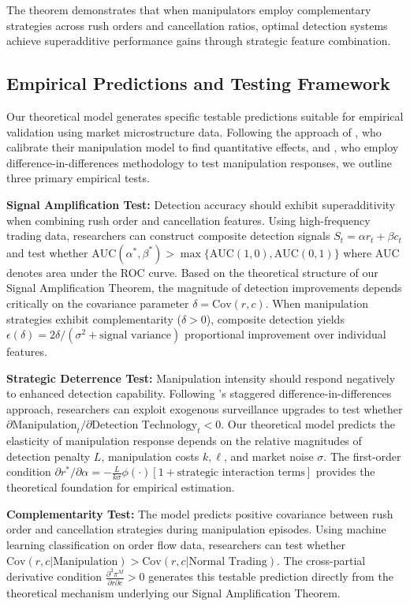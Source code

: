 \documentclass[12pt]{article}
\begin{document}
The theorem demonstrates that when manipulators employ complementary strategies across rush orders and cancellation ratios, optimal detection systems achieve superadditive performance gains through strategic feature combination.

\subsection{Empirical Predictions and Testing Framework}

Our theoretical model generates specific testable predictions suitable for empirical validation using market microstructure data. Following the approach of \citet{liu2024asset}, who calibrate their manipulation model to find quantitative effects, and \citet{xiong2024information}, who employ difference-in-differences methodology to test manipulation responses, we outline three primary empirical tests.

\textbf{Signal Amplification Test:} Detection accuracy should exhibit superadditivity when combining rush order and cancellation features. Using high-frequency trading data, researchers can construct composite detection signals $S_t = \alpha r_t + \beta c_t$ and test whether $\text{AUC}(\alpha^*, \beta^*) > \max\{\text{AUC}(1,0), \text{AUC}(0,1)\}$ where AUC denotes area under the ROC curve. Based on the theoretical structure of our Signal Amplification Theorem, the magnitude of detection improvements depends critically on the covariance parameter $\delta = \text{Cov}(r,c)$. When manipulation strategies exhibit complementarity ($\delta > 0$), composite detection yields $\epsilon(\delta) = 2\delta/(\sigma^2 + \text{signal variance})$ proportional improvement over individual features.

\textbf{Strategic Deterrence Test:} Manipulation intensity should respond negatively to enhanced detection capability. Following \citet{xiong2024information}'s staggered difference-in-differences approach, researchers can exploit exogenous surveillance upgrades to test whether $\partial \text{Manipulation}_t/\partial \text{Detection Technology}_t < 0$. Our theoretical model predicts the elasticity of manipulation response depends on the relative magnitudes of detection penalty $L$, manipulation costs $k, \ell$, and market noise $\sigma$. The first-order condition $\partial r^*/\partial \alpha = -\frac{L}{k\sigma} \phi(\cdot) [1 + \text{strategic interaction terms}]$ provides the theoretical foundation for empirical estimation.

\textbf{Complementarity Test:} The model predicts positive covariance between rush order and cancellation strategies during manipulation episodes. Using machine learning classification on order flow data, researchers can test whether $\text{Cov}(r,c | \text{Manipulation}) > \text{Cov}(r,c | \text{Normal Trading})$. The cross-partial derivative condition $\frac{\partial^2 \pi^M}{\partial r \partial c} > 0$ generates this testable prediction directly from the theoretical mechanism underlying our Signal Amplification Theorem.
\end{document}
